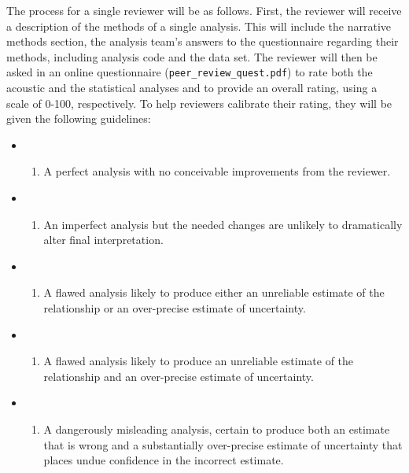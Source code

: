 \documentclass[Review,times,sageh]{sagej}
\providecommand{\tightlist}{\setlength{\itemsep}{0pt}\setlength{\parskip}{0pt}}
\begin{document}
The process for a single reviewer will be as follows.
First, the reviewer will receive a description of the methods of a single analysis.
This will include the narrative methods section, the analysis team's answers to the questionnaire regarding their methods, including analysis code and the data set.
The reviewer will then be asked in an online questionnaire (\texttt{peer\_review\_quest.pdf}) to rate both the acoustic and the statistical analyses and to provide an overall rating, using a scale of 0-100, respectively.
To help reviewers calibrate their rating, they will be given the following guidelines:

\begin{itemize}
\item
  \begin{enumerate}
  \def\labelenumi{\arabic{enumi}.}
  \setcounter{enumi}{99}
  \tightlist
  \item
    A perfect analysis with no conceivable improvements from the reviewer.
  \end{enumerate}
\item
  \begin{enumerate}
  \def\labelenumi{\arabic{enumi}.}
  \setcounter{enumi}{74}
  \tightlist
  \item
    An imperfect analysis but the needed changes are unlikely to dramatically alter final interpretation.
  \end{enumerate}
\item
  \begin{enumerate}
  \def\labelenumi{\arabic{enumi}.}
  \setcounter{enumi}{49}
  \tightlist
  \item
    A flawed analysis likely to produce either an unreliable estimate of the relationship or an over-precise estimate of uncertainty.
  \end{enumerate}
\item
  \begin{enumerate}
  \def\labelenumi{\arabic{enumi}.}
  \setcounter{enumi}{24}
  \tightlist
  \item
    A flawed analysis likely to produce an unreliable estimate of the relationship and an over-precise estimate of uncertainty.
  \end{enumerate}
\item
  \begin{enumerate}
  \def\labelenumi{\arabic{enumi}.}
  \setcounter{enumi}{-1}
  \tightlist
  \item
    A dangerously misleading analysis, certain to produce both an estimate that is wrong and a substantially over-precise estimate of uncertainty that places undue confidence in the incorrect estimate.
  \end{enumerate}
\end{itemize}
\end{document}
